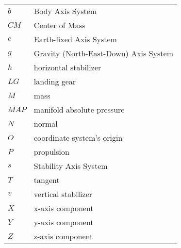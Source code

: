 \begin{longtable}[l]{ l p{} }
  $b$   & Body Axis System \\
  $CM$  & Center of Mass \\
  $e$   & Earth-fixed Axis System \\
  $g$   & Gravity (North-East-Down) Axis System \\
  $h$   & horizontal stabilizer \\
  $LG$  & landing gear \\
  $M$   & mass \\
  $MAP$ & manifold absolute pressure \\
  $N$   & normal \\
  $O$   & coordinate system’s origin \\
  $P$   & propulsion \\
  $s$   & Stability Axis System \\
  $T$   & tangent \\
  $v$   & vertical stabilizer \\
  $X$   & x-axis component \\
  $Y$   & y-axis component \\
  $Z$   & z-axis component \\
\end{longtable}
